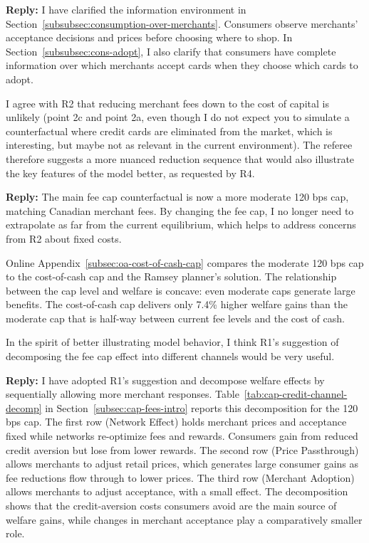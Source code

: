 \documentclass[main.tex]{subfiles}
\begin{document}
\begin{refsection}
\textbf{Reply:} I have clarified the information environment in Section~\ref{subsubsec:consumption-over-merchants}.
Consumers observe merchants' acceptance decisions and prices before choosing where to shop.
In Section~\ref{subsubsec:cons-adopt}, I also clarify that consumers have complete information over which merchants accept cards when they choose which cards to adopt.

\begin{refcommentnoclear}
I agree with R2 that reducing merchant fees down to the cost of capital is unlikely (point 2c and point 2a, even though I do not expect you to simulate a counterfactual where credit cards are eliminated from the market, which is interesting, but maybe not as relevant in the current environment).
The referee therefore suggests a more nuanced reduction sequence that would also illustrate the key features of the model better, as requested by R4.
\end{refcommentnoclear}

\textbf{Reply:} The main fee cap counterfactual is now a more moderate 120 bps cap, matching Canadian merchant fees.
By changing the fee cap, I no longer need to extrapolate as far from the current equilibrium, which helps to address concerns from R2 about fixed costs.

Online Appendix~\ref{subsec:oa-cost-of-cash-cap} compares the moderate 120 bps cap to the cost-of-cash cap and the Ramsey planner's solution.
The relationship between the cap level and welfare is concave: even moderate caps generate large benefits.
The cost-of-cash cap delivers only 7.4\% higher welfare gains than the moderate cap that is half-way between current fee levels and the cost of cash.

\begin{refcommentnoclear}
In the spirit of better illustrating model behavior, I think R1’s suggestion of decomposing the fee cap effect into different channels would be very useful.
\end{refcommentnoclear}

\textbf{Reply:} I have adopted R1's suggestion and decompose welfare effects by sequentially allowing more merchant responses.
Table~\ref{tab:cap-credit-channel-decomp} in Section~\ref{subsec:cap-fees-intro} reports this decomposition for the 120 bps cap.
The first row (Network Effect) holds merchant prices and acceptance fixed while networks re-optimize fees and rewards.
Consumers gain from reduced credit aversion but lose from lower rewards.
The second row (Price Passthrough) allows merchants to adjust retail prices, which generates large consumer gains as fee reductions flow through to lower prices.
The third row (Merchant Adoption) allows merchants to adjust acceptance, with a small effect.
The decomposition shows that the credit-aversion costs consumers avoid are the main source of welfare gains, while changes in merchant acceptance play a comparatively smaller role.


\end{refsection}
\end{document}
